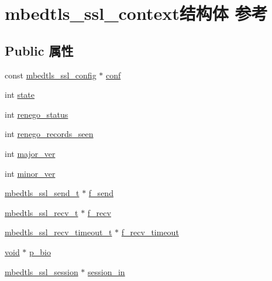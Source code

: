 \hypertarget{structmbedtls__ssl__context}{}\section{mbedtls\+\_\+ssl\+\_\+context结构体 参考}
\label{structmbedtls__ssl__context}
\subsection*{Public 属性}
\begin{DoxyCompactItemize}
\item 
const \hyperlink{structmbedtls__ssl__config}{mbedtls\+\_\+ssl\+\_\+config} $\ast$ \hyperlink{structmbedtls__ssl__context_af91df820bd8e776101c580a89bac9bf7}{conf}
\item 
int \hyperlink{structmbedtls__ssl__context_a32cd4a2bcd224f570b5a350e277ccca3}{state}
\item 
int \hyperlink{structmbedtls__ssl__context_a2d0234b74d1f125e14e1b78a61db2edf}{renego\+\_\+status}
\item 
int \hyperlink{structmbedtls__ssl__context_aa735220d7fc72e44974f70f28fc70814}{renego\+\_\+records\+\_\+seen}
\item 
int \hyperlink{structmbedtls__ssl__context_a149cbf2760485998884d10b530e4580a}{major\+\_\+ver}
\item 
int \hyperlink{structmbedtls__ssl__context_ac68723758d3617fee8ac862931f495b2}{minor\+\_\+ver}
\item 
\hyperlink{ssl_8h_a38e2b400d361f42f85833cdc30b3916e}{mbedtls\+\_\+ssl\+\_\+send\+\_\+t} $\ast$ \hyperlink{structmbedtls__ssl__context_a56c031134adcd848c5fbdab961fe263d}{f\+\_\+send}
\item 
\hyperlink{ssl_8h_ac06b19b96b643090c55f19b6c28b10c4}{mbedtls\+\_\+ssl\+\_\+recv\+\_\+t} $\ast$ \hyperlink{structmbedtls__ssl__context_aa3bb4d87f520cd10d1e84af9d3f0bd86}{f\+\_\+recv}
\item 
\hyperlink{ssl_8h_a6d615ca95c8a67d7c5f9d7d256dc09e6}{mbedtls\+\_\+ssl\+\_\+recv\+\_\+timeout\+\_\+t} $\ast$ \hyperlink{structmbedtls__ssl__context_ab73e4b497e3ed88b3bebad3bada2758b}{f\+\_\+recv\+\_\+timeout}
\item 
\hyperlink{interfacevoid}{void} $\ast$ \hyperlink{structmbedtls__ssl__context_aec081479009cd17997795d6eedf2c641}{p\+\_\+bio}
\item 
\hyperlink{structmbedtls__ssl__session}{mbedtls\+\_\+ssl\+\_\+session} $\ast$ \hyperlink{structmbedtls__ssl__context_a1a54dc6c582580371e94af230077dec1}{session\+\_\+in}

\end{DoxyCompactItemize}
